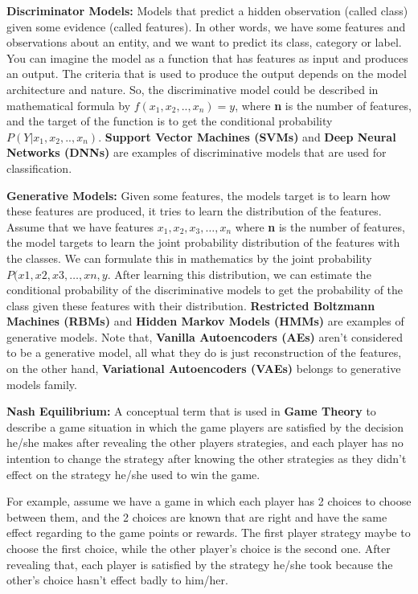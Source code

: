 \documentclass{winnower}
\begin{document}
\textbf{Discriminator Models:} Models that predict a hidden observation (called class) given some evidence (called features). In other words, we have some features and observations about an entity, and we want to predict its class, category or label. You can imagine the model as a function that has features as input and produces an output. The criteria that is used to produce the output depends on the model architecture and nature. So, the discriminative model could be described in mathematical formula by \(f(x_1, x_2, .., x_n) = y\), where \textbf{n} is the number of features, and the target of the function is to get the conditional probability \(P(Y|x_1, x_2, .., x_n)\). \textbf{Support Vector Machines (SVMs)} and \textbf{Deep Neural Networks (DNNs)} are examples of discriminative models that are used for classification.\newline

\textbf{Generative Models:} Given some features, the models target is to learn how these features are produced, it tries to learn the distribution of the features. Assume that we have features \(x_1, x_2, x_3, …, x_n\) where \textbf{n} is the number of features, the model targets to learn the joint probability distribution of the features with the classes. We can formulate this in mathematics by the joint probability \(P(x1, x2, x3, …, xn, y\). After learning this distribution, we can estimate the conditional probability of the discriminative models to get the probability of the class given these features with their distribution. \textbf{Restricted Boltzmann Machines (RBMs)} and \textbf{Hidden Markov Models (HMMs)} are examples of generative models. Note that, \textbf{Vanilla Autoencoders (AEs)} aren’t considered to be a generative model, all what they do is just reconstruction of the features, on the other hand, \textbf{Variational Autoencoders (VAEs)} belongs to generative models family. \newline

\textbf{Nash Equilibrium:} A conceptual term that is used in \textbf{Game Theory} to describe a game situation in which the game players are satisfied by the decision he/she makes after revealing the other players strategies, and each player has no intention to change the strategy after knowing the other strategies as they didn’t effect on the strategy he/she used to win the game.

For example, assume we have a game in which each player has 2 choices to choose between them, and the 2 choices are known that are right and have the same effect regarding to the game points or rewards. The first player strategy maybe to choose the first choice, while the other player’s choice is the second one. After revealing that, each player is satisfied by the strategy he/she took because the other’s choice hasn’t effect badly to him/her. \newline
\end{document}
